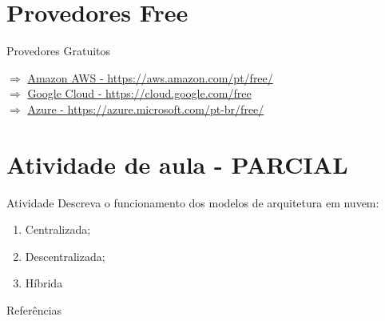 \documentclass{beamer}
\begin{document}
\section{Provedores Free}
\begin{frame}{Provedores Gratuitos}
    
   $ \Rightarrow$ \href{https://aws.amazon.com/pt/free/}{Amazon AWS - https://aws.amazon.com/pt/free/} \\
   \vspace{0.5cm}
   $\Rightarrow$ \href{https://cloud.google.com/free}{Google Cloud - https://cloud.google.com/free} \\
   \vspace{0.5cm}
   $\Rightarrow$ \href{https://azure.microsoft.com/pt-br/free/}{Azure - https://azure.microsoft.com/pt-br/free/}
    
\end{frame}
\section{Atividade de aula - PARCIAL}
\begin{frame}{Atividade}
Descreva o funcionamento dos modelos de arquitetura em nuvem:
\begin{enumerate}
    \item Centralizada;
    \item Descentralizada;
    \item Híbrida
\end{enumerate}
\end{frame}

\begin{frame}{Referências}%
 \tiny
 \begin{center}
 	
	 
 \end{center}
 \end{frame}
\end{document}
